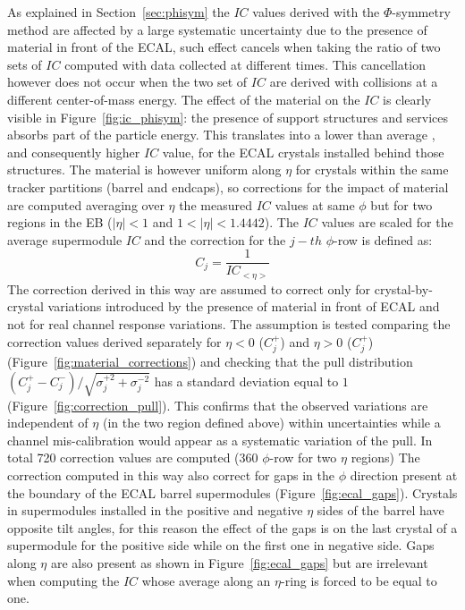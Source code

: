 As explained in Section~\ref{sec:phisym} the $IC$ values derived with the $\Phi$-symmetry method are affected by
a large systematic uncertainty due to the presence of material in front of the ECAL, such effect cancels when taking
the ratio of two sets of $IC$ computed with data collected at different times. This cancellation however does not occur
when the two set of $IC$ are derived with collisions at a different center-of-mass energy.
The effect of the material on the $IC$ is clearly visible in Figure~\ref{fig:ic_phisym}:
the presence of support structures and services
absorbs part of the particle energy. This translates into a lower than average \sumEt, and consequently higher $IC$ value,
for the ECAL crystals installed behind those structures. The material is however uniform along $\eta$ for crystals within 
the same tracker partitions (barrel and endcaps), so corrections for the impact of material are computed averaging
over $\eta$ the measured $IC$ values at same $\phi$ but for two regions in the EB ($|\eta|<1$ and $1<|\eta|<1.4442$).
The $IC$ values are scaled for the average supermodule $IC$ and the correction for the $j-th$ $\phi$-row is defined as:
\[
C_j = \frac{1}{IC_{<\eta >}}
\]
The correction derived in this way are assumed to correct only for crystal-by-crystal variations introduced by the
presence of material in front of ECAL and not for real channel response variations.
The assumption is tested
comparing the correction values derived separately for $\eta <0$ ($C_j^+$) and $\eta > 0$ ($C_j^+$)
(Figure~\ref{fig:material_corrections})
and checking that the pull distribution $(C_j^+ - C_j^-)/\sqrt{\sigma_j^{+ 2}+\sigma_j^{- 2}}$
has a standard deviation equal to $1$ (Figure~\ref{fig:correction_pull}). This confirms that the observed variations
are independent of $\eta$ (in the two region defined above) within uncertainties while a channel mis-calibration
would appear as a systematic variation of the pull.
In total 720 correction values are computed (360 $\phi$-row for two $\eta$ regions) 
The correction computed in this way also correct for gaps in the $\phi$ direction present at the boundary of the ECAL barrel
supermodules (Figure~\ref{fig:ecal_gaps}). Crystals in supermodules installed in the positive and negative $\eta$ sides of the barrel
have opposite tilt angles, for this reason the effect of the gaps is on the last crystal of a supermodule for the positive
side while on the first one in negative side.
Gaps along $\eta$ are also present as shown in Figure~\ref{fig:ecal_gaps} but are irrelevant when computing
the $IC$ whose average along an $\eta$-ring is forced to be equal to one.

